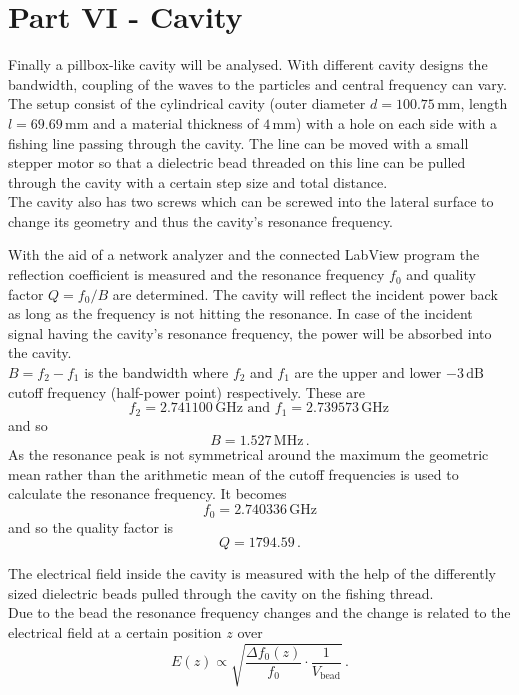 \section{Part VI - Cavity}
Finally a pillbox-like cavity will be analysed. With different cavity designs the bandwidth, coupling of the waves to the particles and central frequency can vary.\\
The setup consist of the cylindrical cavity (outer diameter $d=100.75\,\mathrm{mm}$, length $l=69.69\,\mathrm{mm}$ and a material thickness of $4\,\mathrm{mm}$) with a hole on each side with a fishing line passing through the cavity. The line can be moved with a small stepper motor so that a dielectric bead threaded on this line can be pulled through the cavity with a certain step size and total distance.\\
The cavity also has two screws which can be screwed into the lateral surface to change its geometry and thus the cavity's resonance frequency.
\par
With the aid of a network analyzer and the connected LabView
program the reflection coefficient is measured and the resonance frequency $f_0$ and quality factor $Q=f_0/B$ are determined. 
The cavity will reflect the incident power back as long as the frequency is not hitting the resonance. 
In case of the incident signal having the cavity's resonance frequency, the power will be absorbed into the cavity.\\
$B=f_2-f_1$ is the bandwidth where $f_2$ and $f_1$ are the upper and lower $-3\,\mathrm{dB}$ cutoff frequency (half-power point) respectively.
These are $$f_2=2.741100\,\mathrm{GHz}\text{ and }f_1=2.739573\,\mathrm{GHz}\,$$
and so $$B=1.527\,\mathrm{MHz}\,.$$
As the resonance peak is not symmetrical around the maximum the geometric mean rather than the arithmetic mean of the cutoff frequencies is used to calculate the resonance frequency. It becomes $$f_0=2.740336\,\mathrm{GHz}$$
and so the quality factor is
$$Q=1794.59\,.$$
\par
The electrical field inside the cavity is measured with the help of the differently sized dielectric beads pulled through the cavity on the fishing thread.\\
Due to the bead the resonance frequency changes and the change is related to the electrical field at a certain position $z$ over
$$E(z)\propto\sqrt{\frac{\Delta f_0(z)}{f_0}\cdot\frac{1}{V_{\text{bead}}}}\,.$$